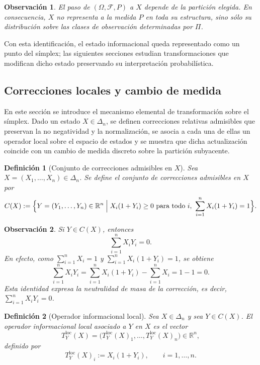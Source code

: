 \documentclass[12pt]{article}
\newtheorem{definicion}{Definición}[section]
\newtheorem{observacion}{Observación}[section]
\begin{document}
\begin{observacion}
El paso de $(\Omega,\mathcal F,P)$ a $X$ depende de la partición elegida. En consecuencia, $X$ no representa a la medida $P$ en toda su estructura, sino sólo su distribución sobre las clases de observación determinadas por $\Pi$.
\end{observacion}

Con esta identificación, el estado informacional queda representado como un punto del símplex; las siguientes secciones estudian transformaciones que modifican dicho estado preservando su interpretación probabilística.

\subsection{Correcciones locales y cambio de medida}

En este sección  se introduce el mecanismo elemental de transformación sobre el símplex. Dado un estado $X\in\Delta_n$, se definen correcciones relativas admisibles que preservan la no negatividad y la normalización, se asocia a cada una de ellas un operador local sobre el espacio de estados y se muestra que dicha actualización coincide con un cambio de medida discreto sobre la partición subyacente.

\begin{definicion}[Conjunto de correcciones admisibles en $X$]\label{def:CX}
Sea $X=(X_1,\dots,X_n)\in\Delta_n$. Se define el \emph{conjunto de correcciones admisibles en $X$} por
\[
C(X)
:=
\Bigl\{
Y=(Y_1,\dots,Y_n)\in\mathbb{R}^n
\;\Big|\;
X_i(1+Y_i)\ge 0\ \text{para todo } i,
\ \sum_{i=1}^n X_i(1+Y_i)=1
\Bigr\}.
\]
\end{definicion}

\begin{observacion}\label{obs:neutralidad}
Si $Y\in C(X)$, entonces
\[
\sum_{i=1}^n X_iY_i=0.
\]
En efecto, como $\sum_{i=1}^n X_i=1$ y $\sum_{i=1}^n X_i(1+Y_i)=1$, se obtiene
\[
\sum_{i=1}^n X_iY_i
=
\sum_{i=1}^n X_i(1+Y_i)-\sum_{i=1}^n X_i
=
1-1
=
0.
\]
Esta identidad expresa la neutralidad de masa de la corrección, es decir, $\sum_{i=1}^n X_iY_i=0$.
\end{observacion}

\begin{definicion}[Operador informacional local]\label{def:Tloc}
Sea $X\in\Delta_n$ y sea $Y\in C(X)$. El \emph{operador informacional local} asociado a $Y$ en $X$ es el vector
\[
T_Y^{\mathrm{loc}}(X)
=
\bigl(T_Y^{\mathrm{loc}}(X)_1,\dots,T_Y^{\mathrm{loc}}(X)_n\bigr)\in\mathbb{R}^n,
\]
definido por
\[
T_Y^{\mathrm{loc}}(X)_i:=X_i(1+Y_i),\qquad i=1,\dots,n.
\]
\end{definicion}
\end{document}
